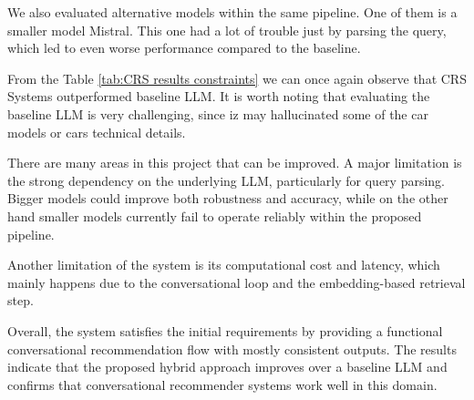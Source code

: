\documentclass[fleqn,moreauthors,10pt]{ds_report}
\begin{document}
\vspace{3pt}
\noindent
We also evaluated alternative models within the same pipeline. 
One of them is a smaller model Mistral. This one had a lot of trouble just by 
parsing the query, which led to even worse performance compared to the baseline.

\vspace{3pt}
\noindent
From the Table \ref{tab:CRS results constraints} we can once again observe 
that CRS Systems outperformed baseline LLM. It is worth noting 
that evaluating the baseline LLM is very challenging, since iz may 
hallucinated some of the car models or cars technical details.

\vspace{3pt}
There are many areas in this project that can be improved. A major limitation is
the strong dependency on the underlying LLM, particularly for query parsing.
Bigger models could improve both robustness and accuracy, while on the other 
hand smaller models
currently fail to operate reliably within the proposed pipeline.


\vspace{3pt}
Another limitation of the system is its computational cost and latency, which 
mainly happens due to the conversational loop and the embedding-based
retrieval step.


\vspace{3pt}
Overall, the system satisfies the initial requirements by providing a
functional conversational recommendation flow with mostly consistent outputs.
The results indicate that the proposed hybrid approach improves over a
baseline LLM and confirms that conversational recommender systems work well in this domain.






\end{document}

